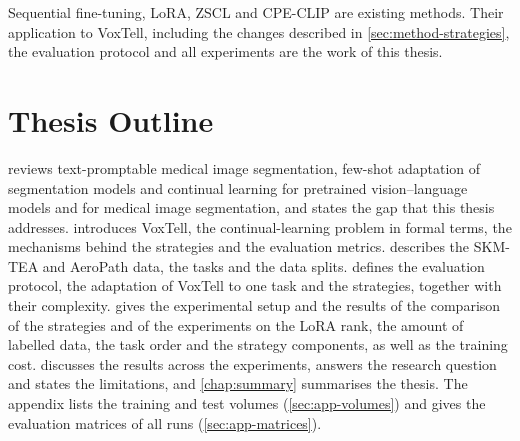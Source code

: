 Sequential fine-tuning, LoRA, ZSCL and CPE-CLIP are existing methods.
Their application to VoxTell, including the changes described in \cref{sec:method-strategies}, the evaluation protocol and all experiments are the work of this thesis.

\section{Thesis Outline}
\label{sec:intro-outline}

 reviews text-promptable medical image segmentation, few-shot adaptation of segmentation models and continual learning for pretrained vision--language models and for medical image segmentation, and states the gap that this thesis addresses.
 introduces VoxTell, the continual-learning problem in formal terms, the mechanisms behind the strategies and the evaluation metrics.
 describes the SKM-TEA and AeroPath data, the tasks and the data splits.
 defines the evaluation protocol, the adaptation of VoxTell to one task and the strategies, together with their complexity.
 gives the experimental setup and the results of the comparison of the strategies and of the experiments on the LoRA rank, the amount of labelled data, the task order and the strategy components, as well as the training cost.
 discusses the results across the experiments, answers the research question and states the limitations, and \cref{chap:summary} summarises the thesis.
The appendix lists the training and test volumes (\cref{sec:app-volumes}) and gives the evaluation matrices of all runs (\cref{sec:app-matrices}).

